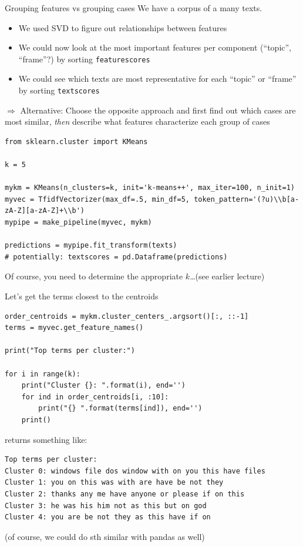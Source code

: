 \documentclass[compress]{beamer}
\begin{document}
\begin{frame}{Grouping features vs grouping cases}
  We have a  corpus of a many texts.
  
\begin{itemize}
\item We used SVD to figure out relationships between features
\item We could now look at the most important features per component (``topic'', ``frame''?) by sorting \texttt{featurescores}
\item We could see which texts are most representative for each ``topic'' or ``frame'' by sorting \texttt{textscores}
\end{itemize}
\pause

$\Rightarrow$ Alternative: Choose the opposite approach and first find out which cases are most similar, \textit{then} describe what features characterize each group of cases


\end{frame}


\begin{frame}
\begin{verbatim}
from sklearn.cluster import KMeans

k = 5

mykm = KMeans(n_clusters=k, init='k-means++', max_iter=100, n_init=1)
myvec = TfidfVectorizer(max_df=.5, min_df=5, token_pattern='(?u)\\b[a-zA-Z][a-zA-Z]+\\b')
mypipe = make_pipeline(myvec, mykm)

predictions = mypipe.fit_transform(texts)
# potentially: textscores = pd.Dataframe(predictions)
\end{verbatim}

Of course, you need to determine the appropriate $k$\ldots (see earlier lecture)



\end{frame}


\begin{frame}{Let's get the terms closest to the centroids}
\begin{lstlisting}
order_centroids = mykm.cluster_centers_.argsort()[:, ::-1]
terms = myvec.get_feature_names()

print("Top terms per cluster:")

for i in range(k):
    print("Cluster {}: ".format(i), end='')
    for ind in order_centroids[i, :10]:
        print("{} ".format(terms[ind]), end='')
    print()

\end{lstlisting}
\pause
returns something like:

\begin{lstlisting}
Top terms per cluster:
Cluster 0: windows file dos window with on you this have files 
Cluster 1: you on this was with are have be not they 
Cluster 2: thanks any me have anyone or please if on this 
Cluster 3: he was his him not as this but on god 
Cluster 4: you are be not they as this have if on 
\end{lstlisting}
(of course, we could do sth similar with pandas as well)
\end{frame}
\end{document}
